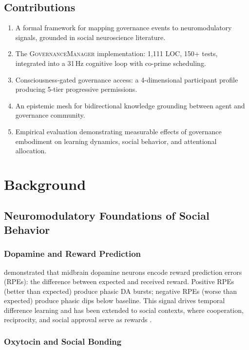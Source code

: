 \documentclass[11pt,a4paper]{article}
\begin{document}
\subsection{Contributions}

\begin{enumerate}
  \item A formal framework for mapping governance events to neuromodulatory signals, grounded in social neuroscience literature.
  \item The \textsc{GovernanceManager} implementation: 1,111 LOC, 150+ tests, integrated into a 31\,Hz cognitive loop with co-prime scheduling.
  \item Consciousness-gated governance access: a 4-dimensional participant profile producing 5-tier progressive permissions.
  \item An epistemic mesh for bidirectional knowledge grounding between agent and governance community.
  \item Empirical evaluation demonstrating measurable effects of governance embodiment on learning dynamics, social behavior, and attentional allocation.
\end{enumerate}

\section{Background}
\label{sec:background}

\subsection{Neuromodulatory Foundations of Social Behavior}

\subsubsection{Dopamine and Reward Prediction}

\citet{schultz1997neural} demonstrated that midbrain dopamine neurons encode reward prediction errors (RPEs): the difference between expected and received reward.
Positive RPEs (better than expected) produce phasic DA bursts; negative RPEs (worse than expected) produce phasic dips below baseline.
This signal drives temporal difference learning \citep{sutton1998introduction} and has been extended to social contexts, where cooperation, reciprocity, and social approval serve as rewards \citep{behrens2009computation, ruff2014neurobiology}.

\subsubsection{Oxytocin and Social Bonding}
\end{document}
